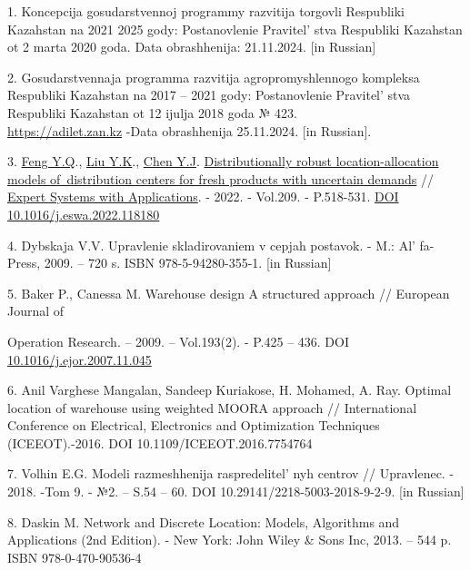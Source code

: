\begin{references}
1. Koncepcija gosudarstvennoj programmy razvitija torgovli Respubliki
Kazahstan na 2021
2025 gody: Postanovlenie Pravitel' stva Respubliki
Kazahstan ot 2 marta 2020 goda.
\href{https://www.gov.kz/memleket/entities/mti/documents/details/61426?lang=ru-}{}
Data obrashhenija: 21.11.2024. {[}in Russian{]}

2. Gosudarstvennaja programma razvitija agropromyshlennogo kompleksa
Respubliki Kazahstan na 2017 -- 2021 gody: Postanovlenie Pravitel' stva
Respubliki Kazahstan ot 12 ijulja 2018 goda № 423.\\
\href{https://adilet.zan.kz/rus/docs/P1800000423}{https://adilet.zan.kz} -Data obrashhenija
25.11.2024. {[}in Russian{]}.

3. \href{https://www.webofscience.com/wos/author/record/34864370}{Feng
Y.Q}.,
\href{https://www.webofscience.com/wos/author/record/33997583}{Liu
Y.K}.,
\href{https://www.webofscience.com/wos/author/record/34807908}{Chen
Y.J}.
\href{https://www.webofscience.com/wos/woscc/full-record/WOS:000859686100002}{Distributionally
robust location-allocation models of~distribution centers for fresh
products with uncertain demands} //
\href{https://www.sciencedirect.com/journal/expert-systems-with-applications}{Expert
Systems with Applications}. - 2022. - Vol.209. - P.518-531.
\href{https://doi.org/10.1016/j.eswa.2022.118180}{DOI
10.1016/j.eswa.2022.118180}

4. Dybskaja V.V. Upravlenie skladirovaniem v cepjah postavok. - M.:
Al' fa-Press, 2009. -- 720 s. ISBN 978-5-94280-355-1.
{[}in Russian{]}

5. Baker P., Canessa M. Warehouse design A structured approach //
European Journal of

Operation Research. -- 2009. -- Vol.193(2). - P.425 -- 436. DOI
\href{http://dx.doi.org/10.1016/j.ejor.2007.11.045}{10.1016/j.ejor.2007.11.045}

6. Anil Varghese Mangalan, Sandeep Kuriakose, H. Mohamed, A. Ray. Optimal
location of warehouse using weighted MOORA approach // International
Conference on Electrical, Electronics and Optimization Techniques
(ICEEOT).-2016. DOI 10.1109/ICEEOT.2016.7754764

7. Volhin E.G. Modeli razmeshhenija raspredelitel' nyh
centrov // Upravlenec. - 2018. -Tom 9. - №2. -- S.54 -- 60. DOI
10.29141/2218-5003-2018-9-2-9. {[}in Russian{]}

8. Daskin M. Network and Discrete Location: Models, Algorithms and
Applications (2nd Edition). - New York: John Wiley \& Sons Inc, 2013. --
544 p. ISBN 978-0-470-90536-4


\end{references}
